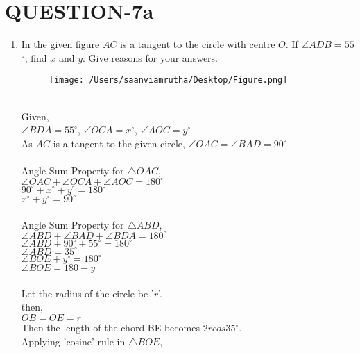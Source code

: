 \documentclass[journal,12pt,twocolumn]{IEEEtran}
\renewcommand\thesection{\arabic{section}}
\begin{document}
\section{\textbf{QUESTION-7a}}
\begin{enumerate}[label=\thesection.\arabic*.,ref=\thesection.\theenumi]

\item In the given figure $AC$ is a tangent to the circle with centre $O$. If $\angle$$ADB=55$$^{\circ}$, find $x$ and $y$. Give reasons for your answers.\\
\begin{figure}[htbp]
\texttt{[image: /Users/saanviamrutha/Desktop/Figure.png]}
\label{fig}
\end{figure}

\solution \\
Given,\\
 $\angle BDA=55^\circ$, $\angle OCA=x^\circ$, $\angle AOC=y^\circ$\\

As $AC$ is a tangent to the given circle, $\angle OAC=\angle BAD=90^\circ$\\
\\
Angle Sum Property for $\triangle OAC$, \\
              $\angle OAC+\angle OCA+\angle AOC=180^\circ$ \\
               $90^\circ+x^\circ+y^\circ=180^\circ$\\
               $x^\circ+y^\circ=90^\circ$\\ \\
               
Angle Sum Property for $\triangle ABD$, \\   
               $\angle ABD+\angle BAD+\angle BDA=180^\circ$\\
               $\angle ABD+90^\circ+55^\circ=180^\circ$\\
               $\angle ABD=35^\circ$\\ 
                
                $\angle BOE+y^\circ=180^\circ$\\
                $\angle BOE=180-y$\\ \\
                Let the radius of the circle be '$r$'.\\
                then,\\
                $OB=OE=r$\\
                Then the length of the chord BE becomes $2rcos 35^\circ$.\\
                Applying 'cosine' rule in $\triangle BOE$,\\ 
              

\end{enumerate}
\end{document}

